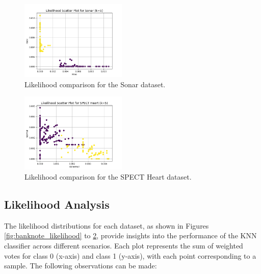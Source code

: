 \documentclass[conference]{IEEEtran}
\begin{document}
\begin{figure}[htbp]
    \centering
    \includegraphics[width=0.45\textwidth]{../scripts/comparison_results/Sonar_likelihoodk5.png}
    \caption{Likelihood comparison for the Sonar dataset.}
    \label{fig:sonar_likelihood}
\end{figure}

\begin{figure}[htbp]
    \centering
    \includegraphics[width=0.45\textwidth]{../scripts/comparison_results/SPECT Heart_likelihoodk5.png}
    \caption{Likelihood comparison for the SPECT Heart dataset.}
    \label{fig:spect_heart_likelihood}
\end{figure}

\subsection{Likelihood Analysis}

The likelihood distributions for each dataset, as shown in Figures \ref{fig:banknote_likelihood} to \ref{fig:spect_heart_likelihood}, provide insights into the performance of the KNN classifier across different scenarios. Each plot represents the sum of weighted votes for class 0 (x-axis) and class 1 (y-axis), with each point corresponding to a sample. The following observations can be made:
\end{document}
